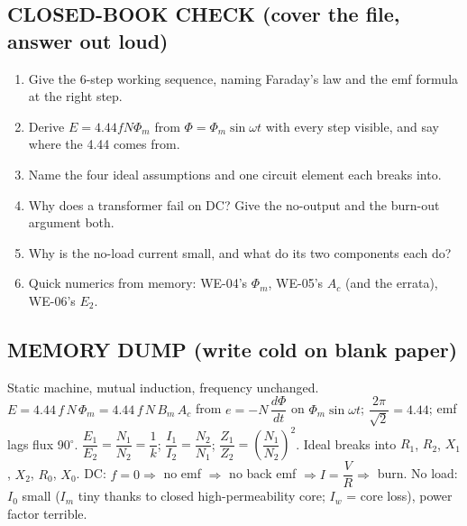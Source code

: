 \documentclass[11pt]{article}
\begin{document}
\subsection*{\color{copper}CLOSED-BOOK CHECK (cover the file, answer out loud)}
\begin{enumerate}[label=\arabic*.]
\item Give the 6-step working sequence, naming Faraday's law and the emf formula at the right step.
\item Derive $E = 4.44 f N \Phi_m$ from $\Phi = \Phi_m\sin\omega t$ with every step visible, and say where the 4.44 comes from.
\item Name the four ideal assumptions and one circuit element each breaks into.
\item Why does a transformer fail on DC? Give the no-output and the burn-out argument both.
\item Why is the no-load current small, and what do its two components each do?
\item Quick numerics from memory: WE-04's $\Phi_m$, WE-05's $A_c$ (and the errata), WE-06's $E_2$.
\end{enumerate}

\subsection*{\color{copper}MEMORY DUMP (write cold on blank paper)}
Static machine, mutual induction, frequency unchanged. $E = 4.44\,f\,N\,\Phi_m = 4.44\,f\,N\,B_m\,A_c$ from $e = -N\,\dfrac{d\Phi}{dt}$ on $\Phi_m \sin\omega t$; $\dfrac{2\pi}{\sqrt{2}} = 4.44$; emf lags flux 90$^\circ$. $\dfrac{E_1}{E_2} = \dfrac{N_1}{N_2} = \dfrac{1}{k}$; $\dfrac{I_1}{I_2} = \dfrac{N_2}{N_1}$; $\dfrac{Z_1}{Z_2} = \left(\dfrac{N_1}{N_2}\right)^{2}$. Ideal breaks into $R_1$, $R_2$, $X_1$, $X_2$, $R_0$, $X_0$. DC: $f = 0 \Rightarrow$ no emf $\Rightarrow$ no back emf $\Rightarrow I = \dfrac{V}{R} \Rightarrow$ burn. No load: $I_0$ small ($I_m$ tiny thanks to closed high-permeability core; $I_w$ = core loss), power factor terrible.
\end{document}
